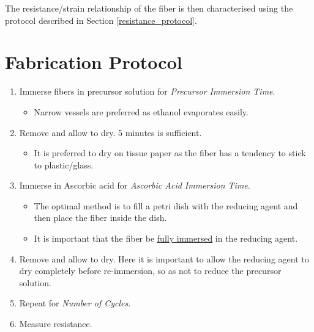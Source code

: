 \documentclass[a4paper, oneside]{discothesis}
\begin{document}
 The resistance/strain relationship of the fiber is then characterised using the protocol described in Section \ref{resistance_protocol}.

\pagebreak

\section{Fabrication Protocol}
\label{fab_protocol}
\begin{enumerate}
    \item Immerse fibers in precursor solution for \textit{Precursor Immersion Time}.
        \begin{itemize}
                \item Narrow vessels are preferred as ethanol evaporates  easily.
            \end{itemize}
    \item Remove and allow to dry. 5 minutes is sufficient.
        \begin{itemize}
            \item It is preferred to dry on tissue paper as the fiber has a tendency to stick to plastic/glass.
        \end{itemize}
    \item Immerse in Ascorbic acid for \textit{Ascorbic Acid Immersion Time}.
        \begin{itemize}
            \item The optimal method is to fill a petri dish with the reducing agent and then place the fiber inside the dish.
            \item It is important that the fiber be \underline{fully immersed} in the reducing agent.
        \end{itemize}
    \item Remove and allow to dry. Here it is important to allow the reducing agent to dry completely before re-immersion, so as not to reduce the precursor solution.
    \item Repeat for \textit{Number of Cycles}.
    \item Measure resistance.
\end{enumerate}
\end{document}
